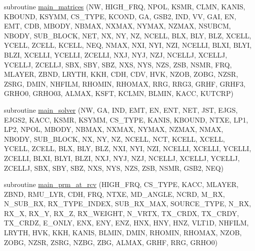 \begin{DoxyCompactItemize}
subroutine \hyperlink{Marco_8f90_a399bcda7d08fa780bc7a58673659436b}{main\+\_\+matrices} (NW, H\+I\+G\+H\+\_\+\+F\+RQ, N\+P\+OL, K\+S\+MR, C\+L\+MN, K\+A\+N\+IS, K\+B\+O\+U\+ND, K\+S\+Y\+MM, C\+S\+\_\+\+T\+Y\+PE, K\+C\+O\+ND, GA, G\+S\+B2, I\+ND, VV, G\+AI, EN, E\+MT, C\+DB, M\+B\+O\+DY, N\+B\+M\+AX, N\+X\+M\+AX, N\+Y\+M\+AX, N\+Z\+M\+AX, N\+S\+U\+B\+CM, N\+B\+O\+DY, S\+U\+B\+\_\+\+B\+L\+O\+CK, N\+ET, NX, NY, NZ, N\+C\+E\+LL, B\+LX, B\+LY, B\+LZ, X\+C\+E\+LL, Y\+C\+E\+LL, Z\+C\+E\+LL, K\+C\+E\+LL, N\+EQ, N\+M\+AX, N\+XI, N\+YI, N\+ZI, N\+C\+E\+L\+LI, B\+L\+XI, B\+L\+YI, B\+L\+ZI, X\+C\+E\+L\+LI, Y\+C\+E\+L\+LI, Z\+C\+E\+L\+LI, N\+XJ, N\+YJ, N\+ZJ, N\+C\+E\+L\+LJ, X\+C\+E\+L\+LJ, Y\+C\+E\+L\+LJ, Z\+C\+E\+L\+LJ, S\+BX, S\+BY, S\+BZ, N\+XS, N\+YS, N\+ZS, Z\+SB, N\+S\+MR, F\+RQ, M\+L\+A\+Y\+ER, Z\+B\+ND, L\+R\+Y\+TH, K\+KH, C\+DH, C\+DV, H\+VK, N\+Z\+OB, Z\+O\+BG, N\+Z\+SR, Z\+S\+RG, D\+M\+IN, N\+H\+F\+I\+LM, R\+H\+O\+M\+IN, R\+H\+O\+M\+AX, R\+RG, R\+R\+G3, G\+R\+HF, G\+R\+H\+F3, G\+R\+H\+O0, G\+R\+H\+O03, A\+L\+M\+AX, K\+S\+FT, K\+C\+L\+MN, B\+L\+M\+IN, K\+A\+CC, K\+U\+T\+C\+RP)
\item 
subroutine \hyperlink{Marco_8f90_a212d574f24aa10a6e92151f2b35d968e}{main\+\_\+solver} (NW, GA, I\+ND, E\+MT, EN, E\+NT, N\+ET, J\+ST, E\+J\+GS, E\+J\+G\+S2, K\+A\+CC, K\+S\+MR, K\+S\+Y\+MM, C\+S\+\_\+\+T\+Y\+PE, K\+A\+N\+IS, K\+B\+O\+U\+ND, N\+T\+XE, L\+P1, L\+P2, N\+P\+OL, M\+B\+O\+DY, N\+B\+M\+AX, N\+X\+M\+AX, N\+Y\+M\+AX, N\+Z\+M\+AX, N\+M\+AX, N\+B\+O\+DY, S\+U\+B\+\_\+\+B\+L\+O\+CK, NX, NY, NZ, N\+C\+E\+LL, N\+CT, K\+C\+E\+LL, X\+C\+E\+LL, Y\+C\+E\+LL, Z\+C\+E\+LL, B\+LX, B\+LY, B\+LZ, N\+XI, N\+YI, N\+ZI, N\+C\+E\+L\+LI, X\+C\+E\+L\+LI, Y\+C\+E\+L\+LI, Z\+C\+E\+L\+LI, B\+L\+XI, B\+L\+YI, B\+L\+ZI, N\+XJ, N\+YJ, N\+ZJ, N\+C\+E\+L\+LJ, X\+C\+E\+L\+LJ, Y\+C\+E\+L\+LJ, Z\+C\+E\+L\+LJ, S\+BX, S\+BY, S\+BZ, N\+XS, N\+YS, N\+ZS, Z\+SB, N\+S\+MR, G\+S\+B2, N\+EQ)
\item 
subroutine \hyperlink{Marco_8f90_adfc6a7cb71bd4ea9c02eaafd4d9e5664}{main\+\_\+prm\+\_\+at\+\_\+rcv} (H\+I\+G\+H\+\_\+\+F\+RQ, C\+S\+\_\+\+T\+Y\+PE, K\+A\+CC, M\+L\+A\+Y\+ER, Z\+B\+ND, R\+M\+U\+\_\+\+L\+YR, C\+DH, F\+RQ, N\+T\+XE, M\+D\+\_\+\+A\+N\+G\+LE, N\+C\+RD, M\+\_\+\+RX, N\+\_\+\+S\+U\+B\+\_\+\+RX, R\+X\+\_\+\+T\+Y\+P\+E\+\_\+\+I\+N\+D\+EX, S\+U\+B\+\_\+\+R\+X\+\_\+\+M\+AX, S\+O\+U\+R\+C\+E\+\_\+\+T\+Y\+PE, N\+\_\+\+RX, R\+X\+\_\+X, R\+X\+\_\+Y, R\+X\+\_\+Z, R\+X\+\_\+\+W\+E\+I\+G\+HT, N\+\_\+\+V\+R\+TX, T\+X\+\_\+\+C\+R\+DX, T\+X\+\_\+\+C\+R\+DY, T\+X\+\_\+\+C\+R\+DZ, E\+\_\+\+O\+N\+LY, E\+NX, E\+NY, E\+NZ, H\+NX, H\+NY, H\+NZ, V\+L\+T1D, N\+H\+F\+I\+LM, L\+R\+Y\+TH, H\+VK, K\+KH, K\+A\+N\+IS, B\+L\+M\+IN, D\+M\+IN, R\+H\+O\+M\+IN, R\+H\+O\+M\+AX, N\+Z\+OB, Z\+O\+BG, N\+Z\+SR, Z\+S\+RG, N\+Z\+BG, Z\+BG, A\+L\+M\+AX, G\+R\+HF, R\+RG, G\+R\+H\+O0)

\end{DoxyCompactItemize}
